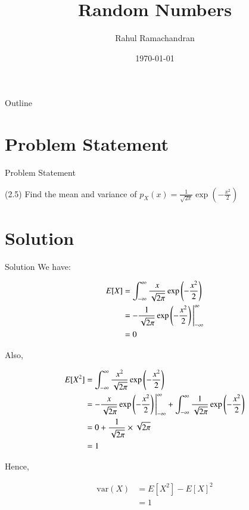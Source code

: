 \documentclass{beamer}
\title{Random Numbers}
\author{Rahul Ramachandran}
\date{\today}
\providecommand{\brak}[1]{\ensuremath{\left(#1\right)}}
\begin{document}
\begin{frame}
    \titlepage 
\end{frame}

\logo{}


\begin{frame}{Outline}
    \tableofcontents
\end{frame}



\section{Problem Statement}
\begin{frame}{Problem Statement}
    \begin{block}{(2.5)} Find the mean and variance of $p_X(x)=\frac{1}{\sqrt{2\pi}}\exp{(-\frac{x^2}{2})}$
    \end{block}
\end{frame}

\section{Solution}
\begin{frame}{Solution}
We have:

\begin{align}
    E[X] &=  \int_{-\infty}^{\infty} \frac{x}{\sqrt{2\pi}}\exp{\left(-\frac{x^2}{2}\right)} \\
    &= -\frac{1}{\sqrt{2\pi}}\exp\brak{-\frac{x^2}{2}} \Bigg{|}_{-\infty}^{\infty} \\
    &= 0 
\end{align}

\end{frame}

Also,

\begin{align}
    E[X^2] &=  \int_{-\infty}^{\infty} \frac{x^2}{\sqrt{2\pi}}\exp{\left(-\frac{x^2}{2}\right)} \\
    &= -\frac{x}{\sqrt{2\pi}}\exp\brak{-\frac{x^2}{2}} \Bigg{|}_{-\infty}^{\infty} + \int_{-\infty}^{\infty} \frac{1}{\sqrt{2\pi}}\exp\brak{-\frac{x^2}{2}}   \\
    &= 0 + \frac{1}{\sqrt{2\pi}} \times \sqrt{2\pi} \\
    &= 1
\end{align}

Hence, 

\begin{align}
    \text{var}(X) &= E[X^2] - E[X]^2 \\ 
    &= 1 
\end{align}
\end{document}

